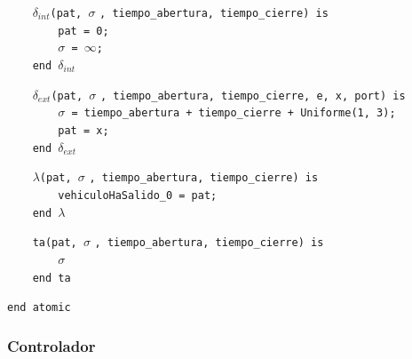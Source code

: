 \documentclass[12pt]{article}
\begin{document}
\begin{tcolorbox}[
    colback=black!5!white,
    colframe=black!80!white,
    boxrule=0.8pt,
    arc=2pt,
    left=5pt,
    right=5pt,
    top=5pt,
    bottom=5pt,
    fontupper=\ttfamily,
    breakable
]
\begin{flushleft}
\texttt{~~~~}$\delta_{int}$\texttt{(pat, }$\sigma$ \texttt{, tiempo\_abertura, tiempo\_cierre) is} \\
\texttt{~~~~~~~~pat = 0;} \\
\texttt{~~~~~~~~}$\sigma$\texttt{ = }\(\infty\)\texttt{;} \\
\texttt{~~~~end }$\delta_{int}$
\end{flushleft}

\begin{flushleft}
\texttt{~~~~}$\delta_{ext}$\texttt{(pat, }$\sigma$ \texttt{, tiempo\_abertura, tiempo\_cierre, e, x, port) is} \\
\texttt{~~~~~~~~}$\sigma$\texttt{ = tiempo\_abertura + tiempo\_cierre + Uniforme(1, 3);} \\
\texttt{~~~~~~~~pat = x;} \\
\texttt{~~~~end }$\delta_{ext}$
\end{flushleft}

\begin{flushleft}
\texttt{~~~~}$\lambda$\texttt{(pat, }$\sigma$ \texttt{, tiempo\_abertura, tiempo\_cierre) is} \\
\texttt{~~~~~~~~vehiculoHaSalido\_0 = pat;} \\
\texttt{~~~~end }$\lambda$
\end{flushleft}

\begin{flushleft}
\texttt{~~~~ta(pat, }$\sigma$ \texttt{, tiempo\_abertura, tiempo\_cierre) is} \\
\texttt{~~~~~~~~}$\sigma$ \\
\texttt{~~~~end ta}
\end{flushleft}

\begin{flushleft}
\texttt{end atomic}
\end{flushleft}
\end{tcolorbox}


\subsubsection{Controlador}
\end{document}
